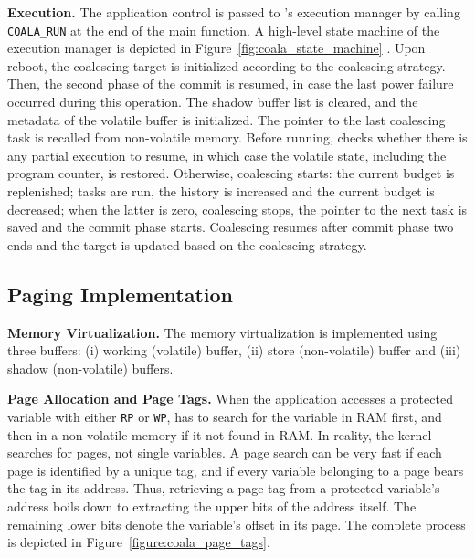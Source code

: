 \noindent \textbf{Execution.} The application control is passed to \sys's execution manager by calling \texttt{COALA\_RUN} at the end of the main function. A high-level state machine of the execution manager is depicted in Figure~\ref{fig:coala_state_machine} . Upon reboot, the coalescing target is initialized according to the coalescing strategy. Then, the second phase of the commit is resumed, in case the last power failure occurred during this operation. The shadow buffer list is cleared, and the metadata of the volatile buffer is initialized. The pointer to the last coalescing task is recalled from non-volatile memory. Before running, \sys checks whether there is any partial execution to resume, in which case the volatile state, including the program counter, is restored. Otherwise, coalescing starts: the current budget is replenished; tasks are run, the history is increased and the current budget is decreased; when the latter is zero, coalescing stops, the pointer to the next task is saved and the commit phase starts. Coalescing resumes after commit phase two ends and the target is updated based on the coalescing strategy. 

\subsection{\sys Paging Implementation}

\noindent \textbf{Memory Virtualization.} The memory virtualization is implemented using three buffers: (i) working (volatile) buffer, (ii) store (non-volatile) buffer and (iii) shadow (non-volatile) buffers. 

\noindent \textbf{Page Allocation and Page Tags.} When the \sys application accesses a protected variable with either \texttt{RP} or \texttt{WP}, \sys has to search for the variable in RAM first, and then in a non-volatile memory if it not found in RAM. In reality, the \sys kernel searches for pages, not single variables. A page search can be very fast if each page is identified by a unique tag, and if every variable belonging to a page bears the tag in its address. Thus, retrieving a page tag from a protected variable's address boils down to extracting the upper bits of the address itself. The remaining lower bits denote the variable's offset in its page. The complete process is depicted in Figure~\ref{figure:coala_page_tags}.

